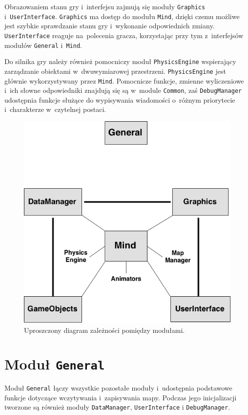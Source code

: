 \documentclass[licencjacka]{pracamgr}
\begin{document}
    Obrazowaniem stanu gry i~interfejsu zajmują się moduły \texttt{Graphics} i~\texttt{UserInterface}.
    \texttt{Graphics} ma dostęp do modułu \texttt{Mind}, dzięki czemu możliwe jest szybkie sprawdzanie stanu
    gry i~wykonanie odpowiednich zmiany. \texttt{UserInterface} reaguje na~polecenia gracza, korzystając przy tym z~interfejsów modułów
    \texttt{General} i~\texttt{Mind}.

    Do silnika gry należy również pomocniczy moduł \texttt{PhysicsEngine} wspierający zarządzanie obiektami w~dwuwymiarowej przestrzeni.
    \texttt{PhysicsEngine} jest głównie wykorzystywany przez \texttt{Mind}. Pomocnicze funkcje, zmienne wyliczeniowe i~ich słowne 
    odpowiedniki znajdują się są w~module \texttt{Common}, zaś \texttt{DebugManager} udostępnia funkcje służące do wypisywania wiadomości
    o~różnym priorytecie i~charakterze w~czytelnej postaci.

    \begin{figure}[htbp]
      \centering
      \includegraphics[scale=0.5]{diagram-klas.png}
      \caption{Uproszczony diagram zależności pomiędzy modułami.}
    \end{figure}

  \section{Moduł \texttt{General}}
    Moduł \texttt{General} łączy wszystkie pozostałe moduły i~udostępnia podstawowe funkcje dotyczące wczytywania i~zapisywania
    mapy. Podczas jego inicjalizacji tworzone są również moduły \texttt{DataManager}, \texttt{UserInterface} i
    \texttt{DebugManager}.
\end{document}
